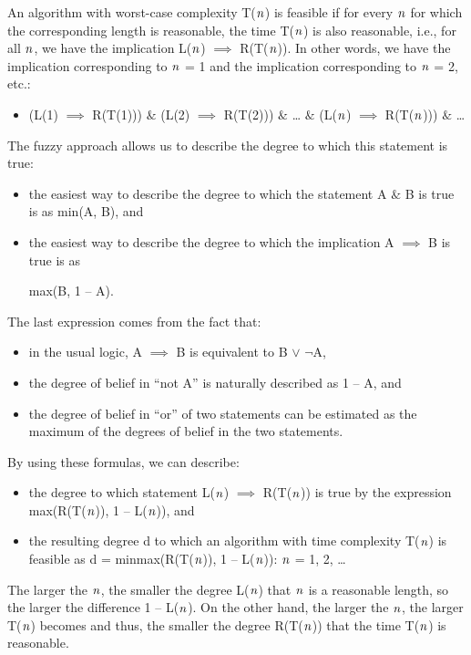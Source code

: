 \documentclass[draft]{article}
\theoremstyle{definition}
\begin{document}
An  algorithm with worst-case complexity T($\it{n}$) is feasible if for every $\it{n}$ for which the corresponding length is reasonable, the time T($\it{n}$) is also reasonable, i.e., for all $\it{n}$, we have the implication L($\it{n}$) $\implies$ R(T($\it{n}$)). In other words, we have the implication corresponding to $\it{n}$ = 1 and the implication corresponding to $\it{n}$ = 2, etc.:
\medskip
    \begin{itemize}
        \item[] (L(1) $\implies$ R(T(1))) $\&$ (L(2) $\implies$ R(T(2))) $\&$ … $\&$ (L($\it{n}$) $\implies$ R(T($\it{n}$))) $\&$ …
    \end{itemize}
\medskip
The fuzzy approach allows us to describe the degree to which this statement is true:
    \begin{itemize}
        \item the easiest way to describe the degree to which the statement A $\&$ B is true is as min(A, B), and
        \item the easiest way to describe the degree to which the implication A $\implies$ B is true is as 
        
        max(B, 1 – A). 
    \end{itemize}
The last expression comes from the fact that:
 
    \begin{itemize}
        \item in the usual logic, A $\implies$ B is equivalent to B $\lor$ $\neg$A, 
        \item the degree of belief in “not A” is naturally described as 1 – A, and 
        \item the degree of belief in “or” of two statements can be estimated as the maximum of the degrees of belief in the two statements. 
    \end{itemize}
By using these formulas, we can describe:

    \begin{itemize}
        \item the degree to which statement L($\it{n}$) $\implies$ R(T($\it{n}$)) is true by the expression max(R(T($\it{n}$)), 1 – L($\it{n}$)), and 
        \item the resulting degree d to which an algorithm with time complexity T($\it{n}$) is feasible as d = min{max(R(T($\it{n}$)), 1 – L($\it{n}$)): $\it{n}$ = 1, 2, …} 
    \end{itemize}
\medskip

The larger the $\it{n}$, the smaller the degree L($\it{n}$) that $\it{n}$ is a reasonable length, so the larger the difference 1 – L($\it{n}$). On the other hand, the larger the $\it{n}$, the larger T($\it{n}$) becomes and thus, the smaller the degree R(T($\it{n}$)) that the time T($\it{n}$) is reasonable. 
\medskip
\end{document}
